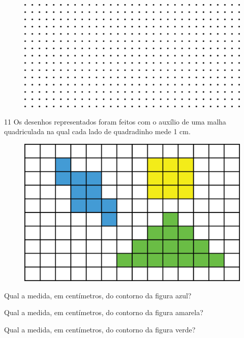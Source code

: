 \begin{figure}[htpb!]
\includegraphics[width=\textwidth]{./media/image58.png}
\end{figure}


\num{11} Os desenhos representados foram feitos com o auxílio de uma malha
quadriculada na qual cada lado de quadradinho mede 1 cm.

\begin{figure}[htpb!]
\includegraphics[width=\textwidth]{./media/image57.png}
\end{figure}

\begin{escolha}
\item Qual a medida, em centímetros, do contorno da figura azul?
\reduline{18 cm\hfill}

\item Qual a medida, em centímetros, do contorno da figura amarela?
\reduline{12 cm\hfill}

\item Qual a medida, em centímetros, do contorno da figura verde?
\reduline{22 cm\hfill}
\end{escolha}


